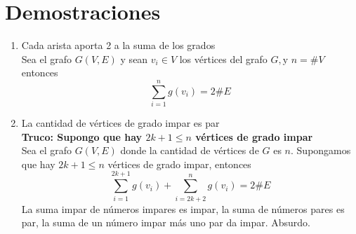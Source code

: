 \documentclass{article}
\begin{document}
\section{Demostraciones}
\begin{enumerate}

\subsection{Grafos}
    \item Cada arista aporta 2 a la suma de los grados \\
    Sea el grafo $G(V, E)$ y sean $v_{i} \in V$ los vértices del grafo $G, \mathrm{y}$ $n=\# V$ entonces
    $$ \sum_{i=1}^{n} g\left(v_{i}\right)=2 \# E $$
    \item La cantidad de vértices de grado impar es par \\
    \textbf{Truco: Supongo que hay $2k+1\leq n$ vértices de grado impar} \\
    Sea el grafo $G(V, E)$ donde la cantidad de vértices de $G$ es $n .$ Supongamos que hay $2 k+1 \leq n$ vértices de grado impar, entonces
    $$ \sum_{i=1}^{2 k+1} g\left(v_{i}\right)+\sum_{i=2 k+2}^{n} g\left(v_{i}\right)=2 \# E $$
    La suma impar de números impares es impar, la suma de números pares es par, la suma de un número impar más uno par da impar. Absurdo.
    

\end{enumerate}
\end{document}
